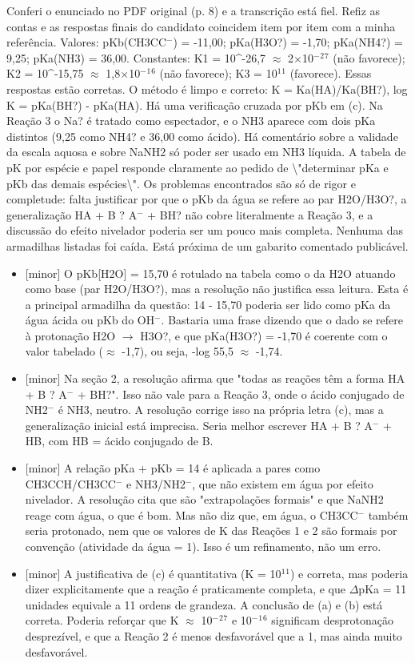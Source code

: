\documentclass{article}%
\begin{document}
Conferi o enunciado no PDF original (p. 8) e a transcrição está fiel. Refiz as contas e as respostas finais do candidato coincidem item por item com a minha referência. Valores: pKb(CH3CC$^{-}$) = -11,00; pKa(H3O?) = -1,70; pKa(NH4?) = 9,25; pKa(NH3) = 36,00. Constantes: K1 = 10\^{}-26,7 $\approx$ 2$\times$10$^{-}$$^2$$^{7}$ (não favorece); K2 = 10\^{}-15,75 $\approx$ 1,8$\times$10$^{-}$$^{1}$$^{6}$ (não favorece); K3 = 10$^{1}$$^{1}$ (favorece). Essas respostas estão corretas. O método é limpo e correto: K = Ka(HA)/Ka(BH?), log K = pKa(BH?) - pKa(HA). Há uma verificação cruzada por pKb em (c). Na Reação 3 o Na? é tratado como espectador, e o NH3 aparece com dois pKa distintos (9,25 como NH4? e 36,00 como ácido). Há comentário sobre a validade da escala aquosa e sobre NaNH2 só poder ser usado em NH3 líquida. A tabela de pK por espécie e papel responde claramente ao pedido de \textbackslash{}"determinar pKa e pKb das demais espécies\textbackslash{}". Os problemas encontrados são só de rigor e completude: falta justificar por que o pKb da água se refere ao par H2O/H3O?, a generalização HA + B ? A$^{-}$ + BH? não cobre literalmente a Reação 3, e a discussão do efeito nivelador poderia ser um pouco mais completa. Nenhuma das armadilhas listadas foi caída. Está próxima de um gabarito comentado publicável.%
\begin{itemize}%
\item%
{[}minor{]} O pKb{[}H2O{]} = 15,70 é rotulado na tabela como o da H2O atuando como base (par H2O/H3O?), mas a resolução não justifica essa leitura. Esta é a principal armadilha da questão: 14 - 15,70 poderia ser lido como pKa da água ácida ou pKb do OH$^{-}$. Bastaria uma frase dizendo que o dado se refere à protonação H2O $\to$ H3O?, e que pKa(H3O?) = -1,70 é coerente com o valor tabelado ($\approx$ -1,7), ou seja, -log 55,5 $\approx$ -1,74.%
\item%
{[}minor{]} Na seção 2, a resolução afirma que "todas as reações têm a forma HA + B ? A$^{-}$ + BH?". Isso não vale para a Reação 3, onde o ácido conjugado de NH2$^{-}$ é NH3, neutro. A resolução corrige isso na própria letra (c), mas a generalização inicial está imprecisa. Seria melhor escrever HA + B ? A$^{-}$ + HB, com HB = ácido conjugado de B.%
\item%
{[}minor{]} A relação pKa + pKb = 14 é aplicada a pares como CH3CCH/CH3CC$^{-}$ e NH3/NH2$^{-}$, que não existem em água por efeito nivelador. A resolução cita que são "extrapolações formais" e que NaNH2 reage com água, o que é bom. Mas não diz que, em água, o CH3CC$^{-}$ também seria protonado, nem que os valores de K das Reações 1 e 2 são formais por convenção (atividade da água = 1). Isso é um refinamento, não um erro.%
\item%
{[}minor{]} A justificativa de (c) é quantitativa (K = 10$^{1}$$^{1}$) e correta, mas poderia dizer explicitamente que a reação é praticamente completa, e que $\Delta$pKa = 11 unidades equivale a 11 ordens de grandeza. A conclusão de (a) e (b) está correta. Poderia reforçar que K $\approx$ 10$^{-}$$^2$$^{7}$ e 10$^{-}$$^{1}$$^{6}$ significam desprotonação desprezível, e que a Reação 2 é menos desfavorável que a 1, mas ainda muito desfavorável.%
\end{itemize}%
\end{document}
